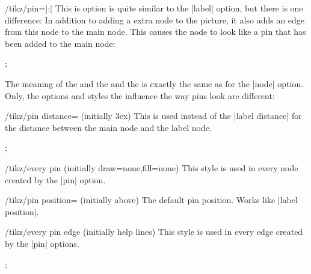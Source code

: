 \begin{key}{/tikz/pin=|:|}
  This is option is quite similar to the |label| option, but there is
  one difference: In addition to adding a extra node to the picture,
  it also adds an edge from this node to the main node. This causes
  the node to look like a pin that has been added to the main node:
\begin{codeexample}[]
\tikz \node [circle,fill=blue!50,minimum size=1cm,pin=60:$q_0$] {};
\end{codeexample}

  The meaning of the  and the  and the
   is exactly the same as for the |node| option. Only, the
  options and styles the influence the way pins look are different:
  \begin{key}{/tikz/pin distance= (initially 3ex)}
    This  is used instead of the |label distance| for
    the distance between the main node and the label node.
\begin{codeexample}[]
\tikz[pin distance=1cm]
  ;
\end{codeexample}
  \end{key}
  \begin{stylekey}{/tikz/every pin (initially {draw=none,fill=none})}
    This style is used in every node created by the |pin|
    option.
  \end{stylekey}
  \begin{key}{/tikz/pin position= (initially above)}
    The default pin position. Works like |label position|.
  \end{key}
  \begin{stylekey}{/tikz/every pin edge (initially help lines)}
    This style is used in every edge created by the |pin| options.
\begin{codeexample}[]
\tikz [pin distance=15mm,
       every pin edge/.style={<-,shorten <=1pt,decorate,
                              decoration={snake,pre length=4pt}}]
  ;
\end{codeexample}
  \end{stylekey}


\end{key}
